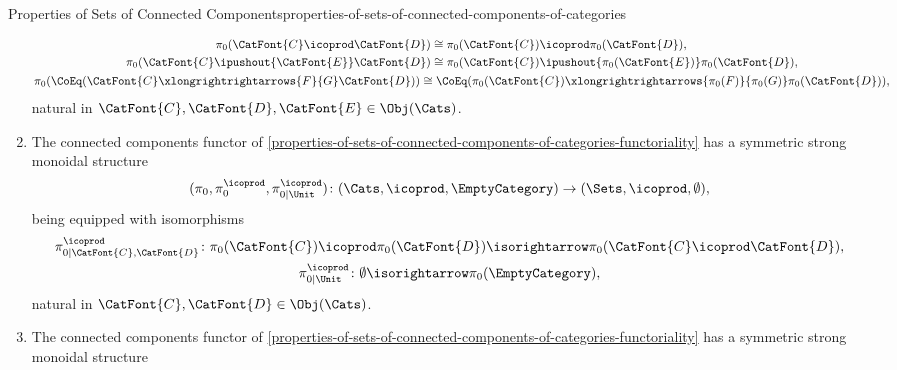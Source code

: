 \begin{proposition}{Properties of Sets of Connected Components}{properties-of-sets-of-connected-components-of-categories}
\begin{enumerate}
            \[
                \begin{gathered}
                    \begin{aligned}
                        \pi_{0}(\CatFont{C}\icoprod\CatFont{D})                       &\cong \pi_{0}(\CatFont{C})\icoprod\pi_{0}(\CatFont{D}),\\
                        \pi_{0}(\CatFont{C}\ipushout{\CatFont{E}}\CatFont{D})         &\cong \pi_{0}(\CatFont{C})\ipushout{\pi_{0}(\CatFont{E})}\pi_{0}(\CatFont{D}),
                    \end{aligned}
                    \\
                    \pi_{0}(\CoEq(\CatFont{C}\xlongrightrightarrows{F}{G}\CatFont{D})) \cong \CoEq(\pi_{0}(\CatFont{C})\xlongrightrightarrows{\pi_{0}(F)}{\pi_{0}(G)}\pi_{0}(\CatFont{D})),
                \end{gathered}
            \]%
            natural in $\CatFont{C},\CatFont{D},\CatFont{E}\in\Obj(\Cats)$.
        \item\label{properties-of-sets-of-connected-components-of-categories-symmetric-strong-monoidality-with-respect-to-coproducts}The connected components functor of \cref{properties-of-sets-of-connected-components-of-categories-functoriality} has a symmetric strong monoidal structure
            \[
                (\pi_{0},\pi^{\icoprod}_{0},\pi^{\icoprod}_{0|\Unit})
                \colon
                (\Cats,\icoprod,\EmptyCategory)
                \to
                (\Sets,\icoprod,\emptyset),
            \]%
            being equipped with isomorphisms%
            \[
                \begin{gathered}
                    \pi^{\icoprod}_{0|\CatFont{C},\CatFont{D}} \colon \pi_{0}(\CatFont{C})\icoprod\pi_{0}(\CatFont{D}) \isorightarrow \pi_{0}(\CatFont{C}\icoprod\CatFont{D}),\\
                    \pi^{\icoprod}_{0|\Unit}                   \colon \emptyset                                        \isorightarrow \pi_{0}(\EmptyCategory),
                \end{gathered}
            \]%
            natural in $\CatFont{C},\CatFont{D}\in\Obj(\Cats)$.%
        \item\label{properties-of-sets-of-connected-components-of-categories-symmetric-strong-monoidality-with-respect-to-products}The connected components functor of \cref{properties-of-sets-of-connected-components-of-categories-functoriality} has a symmetric strong monoidal structure

\end{enumerate}
\end{proposition}
